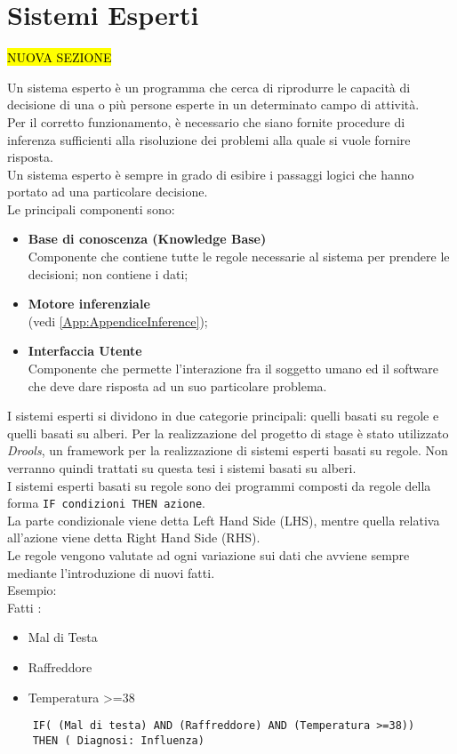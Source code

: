 \section{Sistemi Esperti}
\hl{NUOVA SEZIONE}
 \label{App:AppendiceSistemiEsperti}
 
 Un sistema esperto è un programma che cerca di riprodurre le capacità di decisione di una o più persone esperte in un determinato campo di attività. \\
 Per il corretto funzionamento, è necessario che siano fornite procedure di inferenza sufficienti alla risoluzione dei problemi alla quale si vuole fornire risposta. \\
 Un sistema esperto è sempre in grado di esibire i passaggi logici che hanno portato ad una particolare decisione. \\
 Le principali componenti sono: 
 \begin{itemize}
 	\item \textbf{Base di conoscenza (Knowledge Base)}\\
	 	Componente che contiene tutte le regole necessarie al sistema per prendere le decisioni; non contiene i dati; 
	\item \textbf{Motore inferenziale} \\
	  (vedi \autoref{App:AppendiceInference});
	\item \textbf{Interfaccia Utente} \\
		Componente che permette l'interazione fra il soggetto umano ed il software che deve dare risposta ad un suo particolare problema.
 \end{itemize}
 
 
 I sistemi esperti si dividono in due categorie principali: quelli basati su regole e quelli basati su alberi. 
 Per la realizzazione del progetto di stage è stato utilizzato \textit{Drools}, un framework per la realizzazione di sistemi esperti basati su regole. Non verranno quindi trattati su questa tesi i sistemi basati su alberi.\\
 I sistemi esperti basati su regole sono dei programmi composti da regole della forma \texttt{IF condizioni THEN azione}.\\
  La parte condizionale viene detta Left Hand Side (LHS), mentre quella relativa all'azione viene detta Right Hand Side (RHS).\\
 Le regole vengono valutate ad ogni variazione sui dati che avviene sempre mediante l'introduzione di nuovi fatti.\\
 Esempio: \\
	 Fatti :
	 \begin{itemize}
	 	\item Mal di Testa
	 	\item Raffreddore
	 	\item Temperatura >=38
	 \end{itemize}
 \begin{lstlisting}
	IF( (Mal di testa) AND (Raffreddore) AND (Temperatura >=38))
	THEN ( Diagnosi: Influenza)
 \end{lstlisting}

 
 

